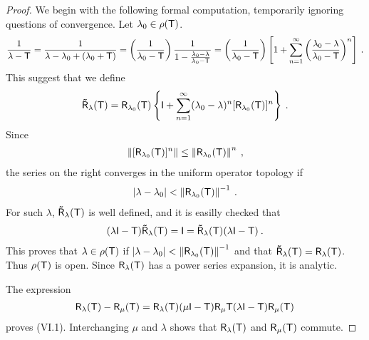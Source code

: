 \begin{proof}
    We begin with the following formal computation, temporarily ignoring questions of convergence. Let $\lambda_0 \in \rho(\mathsf{T})$.
    \begin{align}
        \frac{1}{\lambda - \mathsf{T}} = \frac{1}{\lambda - \lambda_0 + (\lambda_0 + \mathsf{T})} = \left( \frac{1}{\lambda_0 - \mathsf{T}} \right) \dfrac{1}{1 - \frac{\lambda_0 - \lambda}{\lambda_0 - \mathsf{T}}} = \left( \frac{1}{\lambda_0 - \mathsf{T}} \right) \left[ 1 + \sum_{n=1}^\infty \left( \frac{\lambda_0 - \lambda }{\lambda_0 - \mathsf{T}} \right)^n\right] \:.
    \end{align}
    This suggest that we define \begin{align}
        \mathsf{\tilde R}_\lambda (\mathsf{T}) = \mathsf{R}_{\lambda_0} (\mathsf{T}) \left\lbrace \mathsf{I} + \sum_{n=1}^\infty (\lambda_0 - \lambda)^n [\mathsf{R}_{\lambda_0} (\mathsf{T})]^n \right\rbrace \:.
    \end{align}
    Since \begin{align}
        \left \Vert [\mathsf{R}_{\lambda_0}(\mathsf{T})]^n \right \Vert \leq \left \Vert \mathsf{R}_{\lambda_0} (\mathsf{T}) \right \Vert^n \:,
    \end{align}
    the series on the right converges in the uniform operator topology if \begin{align}
        |\lambda - \lambda_0| < \left \Vert \mathsf{R}_{\lambda_0}(\mathsf{T}) \right \Vert^{-1} \:.
    \end{align}
    For such $\lambda$, $\mathsf{\tilde R}_{\lambda}(\mathsf{T})$ is well defined, and it is easilly checked that \begin{align}
        (\lambda \mathsf{I} - \mathsf{T}) \mathsf{\tilde R}_{\lambda} (\mathsf{T}) = \mathsf{I} = \mathsf{\tilde R}_{\lambda}(\mathsf{T})(\lambda \mathsf{I} - \mathsf{T}) \:.
    \end{align}
    This proves that $\lambda \in \rho(\mathsf{T})$ if $|\lambda - \lambda_0| < \left \Vert \mathsf{R}_{\lambda_0}(\mathsf{T}) \right \Vert^{-1}$ and that $\mathsf{\tilde R}_\lambda (\mathsf{T}) = \mathsf{R}_\lambda (\mathsf{T})$. Thus $\rho(\mathsf{T})$ is open. Since $\mathsf{R}_\lambda (\mathsf{T})$ has a power series expansion, it is analytic.
    
    The expression \begin{align}
        \mathsf{R}_\lambda (\mathsf{T}) - \mathsf{R}_\mu (\mathsf{T}) = \mathsf{R}_\lambda (\mathsf{T}) (\mu \mathsf{I} - \mathsf{T}) \mathsf{R}_{\mu} \mathsf{T} (\lambda \mathsf{I} - \mathsf{T}) \mathsf{R}_\mu (\mathsf{T})
    \end{align}
    proves (VI.1). Interchanging $\mu$ and $\lambda$ shows that $\mathsf{R}_\lambda( \mathsf{T})$ and $\mathsf{R}_\mu (\mathsf{T})$ commute.
\end{proof}


